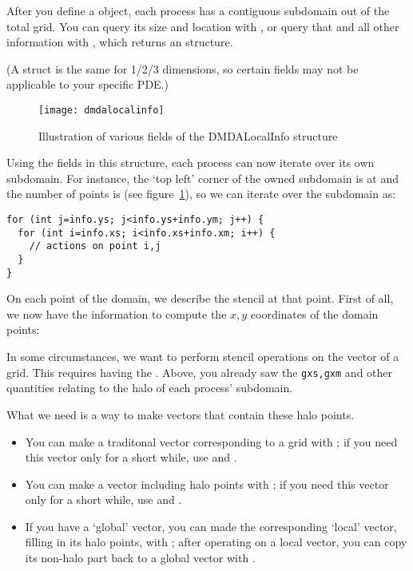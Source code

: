 
After you define a  object, each process has a contiguous
subdomain out of the total grid.
You can query its size and location with ,
or query that and all other information with ,
which returns an  structure.

(A  struct is the same for 1/2/3 dimensions,
so certain fields may not be applicable to your specific \ac{PDE}.)

\begin{figure}[ht]
  \texttt{[image: dmdalocalinfo]}
  \caption{Illustration of various fields of the DMDALocalInfo structure}
  \label{fig:dmdalocalinfo}
\end{figure}

Using the fields in this structure, each process can now iterate over its
own subdomain.
For instance, the `top left' corner of the owned subdomain is at 
and the number of points is 
(see figure~\ref{fig:dmdalocalinfo}),
so we can iterate over the subdomain as:

\begin{lstlisting}
for (int j=info.ys; j<info.ys+info.ym; j++) {
  for (int i=info.xs; i<info.xs+info.xm; i++) {
    // actions on point i,j
  }
}
\end{lstlisting}

On each point of the domain, we describe the stencil at that point.
First of all, we now have the information to compute the $x,y$ coordinates
of the domain points:
%

In some circumstances, we want to perform stencil operations
on the vector of a  grid.
This requires having the .
Above, you already saw the \lstinline{gxs,gxm} and other
quantities relating to the halo of each process' subdomain.

What we need is a way to make vectors that contain these halo points.
\begin{itemize}
\item You can make a traditonal vector corresponding to a grid with
  ;
  if you need this vector only for a short while,
  use  and .
\item You can make a vector including halo points with
  ;
  if you need this vector only for a short while,
  use  and .
\item If you have a `global' vector, you can made the corresponding `local' vector,
  filling in its halo points, with ;
  after operating on a local vector, you can copy its non-halo part back
  to a global vector with .
\end{itemize}

